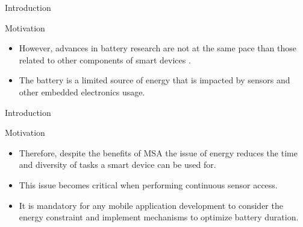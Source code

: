 \begin{frame}{Introduction}
  \begin{block}{Motivation}
    \begin{itemize}
      \item However, advances in battery research are not at the same pace than those related to other components of smart devices \citep{Kjaergaard2012}.
      \item The battery is a limited source of energy that is impacted by sensors and other embedded electronics usage.
    \end{itemize}
  \end{block}

  \begin{table}[]
  \caption{Average energy consumption of a Nokia N95 Smartphone (in \citep{Kjaergaard2012})}
\end{table}
\end{frame}

\begin{frame}{Introduction}
  \begin{block}{Motivation}
    \begin{itemize}
      \item Therefore, despite the benefits of MSA the issue of energy reduces the time and diversity of tasks a smart device can be used for.
      \item This issue becomes critical when performing continuous sensor access.
      \item It is mandatory for any mobile application development to consider the energy constraint and implement mechanisms to optimize battery duration.
    \end{itemize}
  \end{block}
\end{frame}